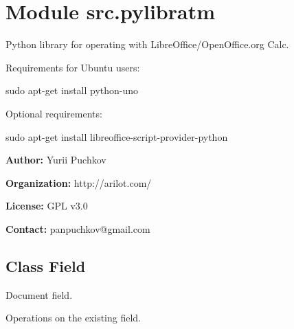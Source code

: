 %
%
%


\section{Module src.pylibratm}

    \label{src:pylibratm}
Python library for operating with LibreOffice/OpenOffice.org Calc.

Requirements for Ubuntu users:

sudo apt-get install python-uno

Optional requirements:

sudo apt-get install libreoffice-script-provider-python

\textbf{Author:} Yurii Puchkov



\textbf{Organization:} http://arilot.com/



\textbf{License:} GPL v3.0



\textbf{Contact:} panpuchkov@gmail.com





\subsection{Class Field}

    \label{src:pylibratm:Field}
Document field.

Operations on the existing field.



